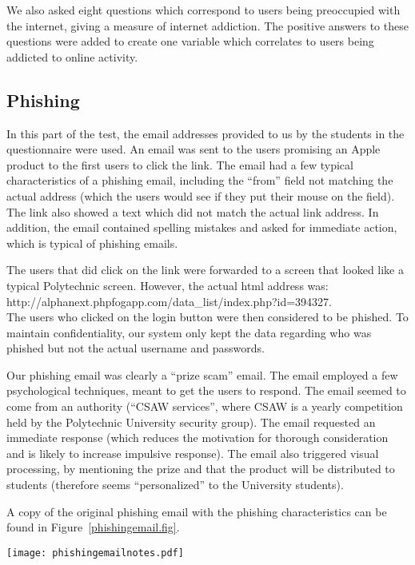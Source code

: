 \documentclass{sig-alternate}
\newcommand{\figref}[1]{Figure~\protect\ref{#1.fig}}
\begin{document}
We also asked eight questions which correspond to users being preoccupied with the internet, giving a measure of internet addiction. The positive answers to these questions were added to create one variable which correlates to users being addicted to online activity. 

\subsection{Phishing}
In this part of the test, the email addresses provided to us by the students in the questionnaire were used. An email was sent to the users promising an Apple product to the first users to click the link. The email had a few typical characteristics of a phishing email, including the ``from'' field not matching the actual address (which the users would see if they put their mouse on the field). The link also showed a text which did not match the actual link address. In addition, the email  contained spelling mistakes and asked for immediate action, which is typical of phishing emails.

The users that did click on the link were forwarded to a screen that looked like a typical Polytechnic screen. However, the actual html address was:\\ http://alphanext.phpfogapp.com/data\_list/index.php?id=394327.\\
The users who clicked on the login button were then considered to be phished.
To maintain confidentiality, our system only kept the data regarding who was phished but not the actual username and passwords.

Our phishing email was clearly a ``prize scam'' email. The email employed a few psychological techniques, meant to get the users to respond. The email seemed to come from an authority (``CSAW services'', where CSAW is a yearly competition held by the Polytechnic University security group). The email requested an immediate response (which reduces the motivation for thorough consideration and is likely to increase impulsive response). The email also triggered visual processing, by mentioning the prize and 
that
the product will be distributed to students (therefore seems ``personalized'' to the University students).



A copy of the original phishing email with the phishing characteristics can be found in \figref{phishingemail}.

\begin{figure*}[ht]
  \centering
  \texttt{[image: phishingemailnotes.pdf]}
  \caption{Phishing email}
  \label{phishingemail.fig}
  \vspace{5mm}
\end{figure*}
\end{document}
